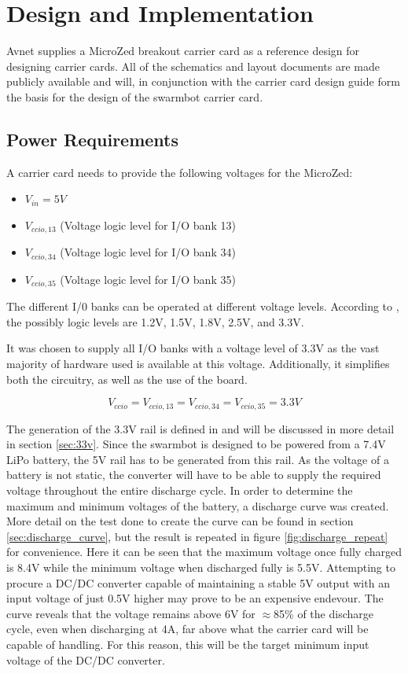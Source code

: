 \section{Design and Implementation}
Avnet supplies a MicroZed breakout carrier card as a reference design for designing carrier cards.
All of the schematics and layout documents are made publicly available and will, in conjunction with the carrier card design guide \cite{design_carrier} form the basis for the design of the swarmbot carrier card.

\subsection{Power Requirements}
\label{sub:power_req}
A carrier card  needs to provide the following voltages for the MicroZed:
\begin{itemize}
	\item $V_{in} = 5V$
	\item $V_{ccio,13}$ (Voltage logic level for I/O bank 13)
	\item $V_{ccio,34}$ (Voltage logic level for I/O bank 34)
	\item $V_{ccio,35}$ (Voltage logic level for I/O bank 35)
\end{itemize}
The different I/0 banks can be operated at different voltage levels.
According to \cite{zynq_dc}, the possibly logic levels are 1.2V, 1.5V, 1.8V, 2.5V, and 3.3V.

It was chosen to supply all I/O banks with a voltage level of 3.3V as the vast majority of hardware used is available at this voltage.
Additionally, it simplifies both the circuitry, as well as the use of the board.

$$ V_{ccio} =  V_{ccio,13} = V_{ccio,34} = V_{ccio,35} = 3.3V$$

The generation of the 3.3V rail is defined in \cite{carrier_schematic} and will be discussed in more detail in section \ref{sec:33v}.
Since the swarmbot is designed to be powered from a 7.4V LiPo battery, the 5V rail has to be generated from this rail.
As the voltage of a battery is not static, the converter will have to be able to supply the required voltage throughout the entire discharge cycle.
In order to determine the maximum and minimum voltages of the battery, a discharge curve was created.
More detail on the test done to create the curve can be found in section \ref{sec:discharge_curve}, but the result is repeated in figure \ref{fig:discharge_repeat} for convenience.
Here it can be seen that the maximum voltage once fully charged is 8.4V while the minimum voltage when discharged fully is 5.5V.
Attempting to procure a DC/DC converter capable of maintaining a stable 5V output with an input voltage of just 0.5V higher may prove to be an expensive endevour.
The curve reveals that the voltage remains above 6V for $\approx$85\% of the discharge cycle, even when discharging at 4A, far above what the carrier card will be capable of handling.
For this reason, this will be the target minimum input voltage of the DC/DC converter.

